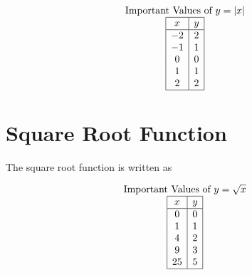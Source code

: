 \documentclass[nooutcomes]{ximera}
\begin{document}
\begin{image}
\end{image}

\[
\begin{array}{c }
\text{Important Values of $y=|x|$} \\
\begin{array}{|c|c|}
 \hline
 x & y\\
 \hline
 -2&2\\ 
-1&1\\ 
0&0\\
 1&1\\
 2&2\\
 \hline
\end{array}
\end{array}
\]



\newpage


\section{Square Root Function}
The square root function is written as

\begin{image}
\end{image}

\begin{image}
\end{image}


\[
\begin{array}{c }
 \text{Important Values of $y=\sqrt{x}$} \\
\begin{array}{|c|c|}
 \hline
 x & y\\
 \hline
 0&0\\
 1&1\\
 4&2\\
 9&3\\
 25&5\\
 \hline
\end{array}
\end{array}
\]
\end{document}
